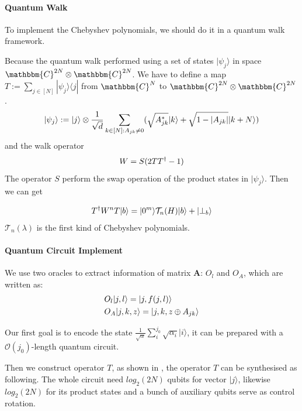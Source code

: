 \documentclass[%
 reprint,
 amsmath,amssymb,
pra,
]{revtex4-1}
\begin{document}
\paragraph{Quantum Walk}
To implement the Chebyshev polynomials, we should do it in a quantum walk 
framework. 

Because the quantum walk performed using a set of states $|\psi_j\rangle$
in space $\mathbbm{C}^{2N}\otimes
\mathbbm{C}^{2N}$.
We have to define a map $T:=\sum_{j\in [N]}|\psi_j\rangle\langle j|$ from
$\mathbbm{C}^{N}$ to $\mathbbm{C}^{2N}\otimes\mathbbm{C}^{2N}$.
\begin{equation}
|\psi_j\rangle:=|j\rangle\otimes \frac{1}{\sqrt{d}}
\sum_{k\in [N]:A_{jk}\neq 0}(\sqrt{A^*_{jk}}|k\rangle+\sqrt{1-|A_{jk}|}|k+N
\rangle)\notag
\end{equation}
and the walk operator
\begin{equation}
W=S(2TT^\dagger-1)\notag
\end{equation}
The operator $S$ perform the swap operation of the product states in 
$|\psi_j\rangle$. Then we can get 

\begin{equation}
T^{\dagger}W^nT|b\rangle=|0^m\rangle\mathcal{T}_n(H)|b\rangle+|\bot_b\rangle\notag
\end{equation}
$\mathcal{T}_n(\lambda)$ is the first kind of Chebyshev polynomials.

\paragraph{Quantum Circuit Implement}
We use two oracles to extract information of matrix $\bm{A}$: $O_l$ and $O_A$, which are written as:
\begin{align}
&O_l|j,l\rangle=|j,f(j,l)\rangle\notag\\
&O_A|j,k,z\rangle=|j,k,z\oplus A_{jk}\rangle\notag
\end{align}


Our first goal is to encode the state $\frac{1}
{\sqrt{\alpha}}\sum_i^{j_0}\sqrt{\alpha_i}|i\rangle$, it can be prepared with a $\mathcal{O}(j_0)$-length quantum circuit.

Then we construct operator $T$, as shown in \cite{berry2015hamiltonian}, the operator $T$ can be synthesised as following.
The whole circuit need $log_2(2N)$ qubits for vector $|j\rangle$, likewise 
$log_2(2N)$ for its product states and a bunch of auxiliary qubits serve as 
control rotation.
\end{document}
